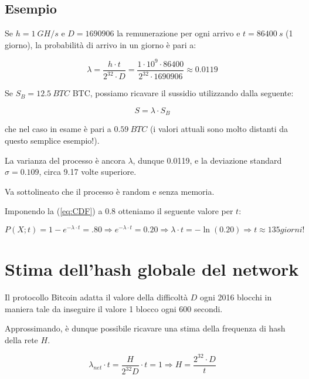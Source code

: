 \documentclass{book}
\theoremstyle{definition}
\begin{document}
\subsection{Esempio}

Se $h = 1 \ GH/s$ e $D = 1690906$ la remunerazione per ogni arrivo e $t = 86400 \ s$ (1 giorno), la probabilità di arrivo in un giorno è pari a:

\begin{equation}
    \lambda = \frac{h \cdot t}{2^{32} \cdot D} = \frac{1 \cdot 10^{9} \cdot 86400}{2^{32} \cdot 1690906} \approx 0.0119
\end{equation}

Se $S_{B} = 12.5 \ BTC$ BTC, possiamo ricavare il sussidio utilizzando dalla seguente:

\begin{equation}
    S = \lambda \cdot S_{B} \label{eq:lamdaToSubside}
\end{equation}

che nel caso in esame è pari a $0.59 \ BTC$ (i valori attuali sono molto distanti da questo semplice esempio!).

La varianza del processo è ancora $\lambda$, dunque 0.0119, e la deviazione standard $\sigma = 0.109$, circa 9.17 volte superiore.

Va sottolineato che il processo è random e senza memoria.

Imponendo la (\ref{eq:CDF}) a 0.8 otteniamo il seguente valore per $t$:

\begin{equation}
    P(X; t) = 1 - e^{-\lambda \cdot t} = .80 \Rightarrow  e^{-\lambda \cdot t} = 0.20 \Rightarrow  {\lambda \cdot t} = -\ln(0.20) \Rightarrow t \approx 135 \textit{giorni!} 
\end{equation}

\section{Stima dell'hash globale del network} \label{stima_hash_growth}

Il protocollo Bitcoin adatta il valore della difficoltà $D$ ogni 2016 blocchi in maniera tale da inseguire il valore 1 blocco ogni 600 secondi.

Approssimando, è dunque possibile ricavare una stima della frequenza di hash della rete $H$.

\begin{equation}
    \lambda_{net} \cdot t = \frac{H}{2^{32}D} \cdot t = 1 \Rightarrow H = \frac{2^{32} \cdot D}{t} \label{lamda_net}
\end{equation}
\end{document}
